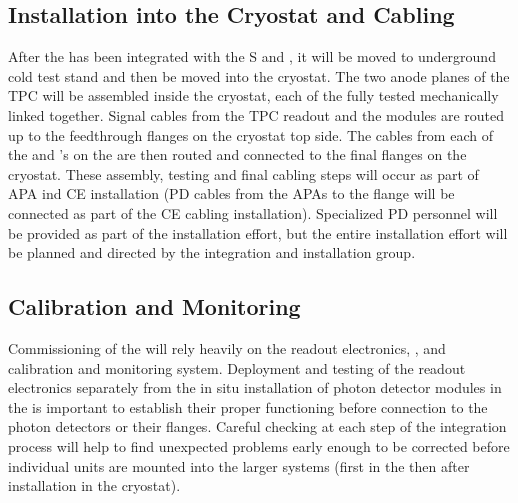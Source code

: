 \subsection{Installation into the Cryostat and Cabling}
\label{sec:fdsp-pd-install-pd-cryo}


After the  has been integrated with the S and , it will be moved to underground 
cold test stand 
and then be moved into the cryostat. The two anode planes of the TPC will be assembled inside the cryostat, each of the fully tested  mechanically linked together. Signal cables from the TPC readout and the  modules are routed up to the feedthrough flanges on the cryostat top side. The cables from each of the  and 's on the  are then routed and connected to the final flanges on the cryostat.  These assembly, testing and final cabling steps will occur as part of APA ind CE installation (PD cables from the APAs to the flange will be connected as part of the CE cabling installation).  Specialized PD personnel will be provided as part of the installation effort, but the entire installation effort will be planned and directed by the integration and installation group.

\subsection{Calibration and Monitoring}
\label{sec:fdsp-pd-install-calib}


Commissioning of the   will rely heavily on the readout electronics, , and calibration and monitoring system.  Deployment and testing of the readout electronics separately from the in situ installation of photon detector modules in the  is important to establish their proper functioning before connection to the photon detectors or their flanges.  Careful checking at each step of the integration process will help to find unexpected problems early enough to be corrected before individual units are mounted into the larger systems (first in the  then after installation in the cryostat). 

